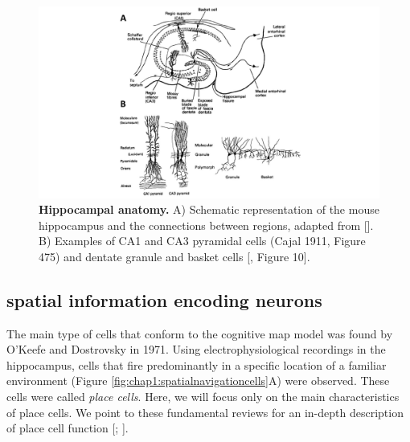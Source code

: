 \begin{figure}
    \centering
    \includegraphics[trim={200 0 200 0},clip, width=\textwidth]{Figures/Chapter1/intro_fig_hipp_anat.pdf}
    \caption[Hippocampal anatomy.]{\textbf{Hippocampal anatomy.} A) Schematic representation of the mouse hippocampus and the connections between regions, adapted from [\cite{okeefebook}]. 
    B) Examples of CA1 and CA3 pyramidal cells (Cajal 1911, Figure 475) and dentate granule and basket cells [\cite{lorente1934}, Figure 10].}
    \label{fig:chap1:hippocampal_anat}
\end{figure}

\subsection{spatial information encoding neurons}
\label{chap1:sec:1:subsec2:spat_info_cells}
The main type of cells that conform to the cognitive map model was found by O’Keefe and Dostrovsky in 1971. 
Using electrophysiological recordings in the hippocampus, cells that fire predominantly in a specific location of a familiar environment (Figure \ref{fig:chap1:spatialnavigationcells}A) were observed.
These cells were called \textit{place cells}. 
Here, we will focus only on the main characteristics of place cells. 
We point to these fundamental reviews for an in-depth description of place cell function [\cite{moser2015place}; \cite{best2001spatial}].

